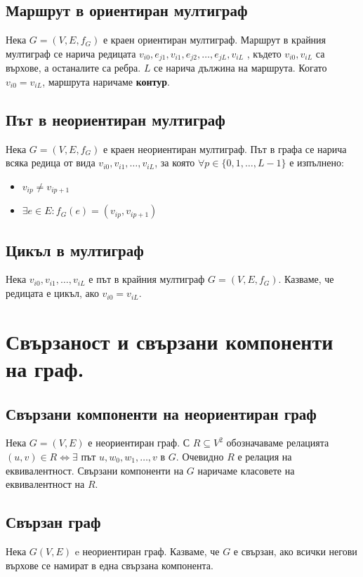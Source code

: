 \documentclass[fleqn,12pt]{article}
\begin{document}
\subsection{Маршрут в ориентиран мултиграф}
Нека $G = (V, E, f_G)$ е краен ориентиран мултиграф. Маршрут в крайния мултиграф се нарича
редицата $v_{i0}, e_{j1}, v_{i1}, e_{j2} , \dots , e_{jL} , v_{iL}$ , където $v_{i0}, v_{iL}$ са върхове, а останалите са ребра. 
$L$ се нарича дължина на маршрута. Когато $v_{i0} = v_{iL}$, маршрута наричаме \textbf{контур}.

\subsection{Път в неориентиран мултиграф}
Нека $G = (V, E, f_G)$ е краен неориентиран мултиграф. Път в графа се нарича всяка редица от вида
$v_{i0}, v_{i1}, \dots, v_{iL}$, за която $\forall p \in \{ 0, 1, \dots, L - 1 \}$ е изпълнено:
\begin{itemize}
	\item $v_{ip} \neq v_{ip+1}$
	\item $\exists e \in E : f_G(e) = (v_{ip}, v_{ip+1})$
\end{itemize}

\subsection{Цикъл в мултиграф}
Нека $v_{i0}, v_{i1}, \dots, v_{iL}$ е път в крайния мултиграф $G = (V, E, f_G)$.
Казваме, че редицата е цикъл, ако $v_{i0} = v_{iL}$.

\section{Свързаност и свързани компоненти на граф.} 

\subsection{Свързани компоненти на неориентиран граф}
Нека $G = (V, E)$ е неориентиран граф. 
С $R \subseteq V^2$ обозначаваме релацията $ (u, v) \in R \Leftrightarrow \exists $ път $u, w_0, w_1, \dots, v$ в $G$.
Очевидно $R$ е релация на еквивалентност. Свързани компоненти на $G$ наричаме класовете на еквивалентност на $R$.

\subsection{Свързан граф}
Нека $G(V, E)$ e неориентиран граф. Казваме, че $G$ е свързан, ако всички негови върхове
се намират в една свързана компонента.
\end{document}
